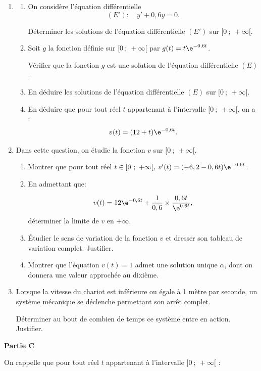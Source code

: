 \begin{enumerate}
\item 
	\begin{enumerate}
		\item On considère l'équation différentielle 
		\[(E') :\quad y' + 0,6y = 0.\]
		
Déterminer les solutions de l'équation différentielle $(E')$ sur $[0~;~+\infty[$.
		\item Soit $g$ la fonction définie sur $[0~;~+\infty[$ par $g(t) = t\e^{-0,6t}$.
		
Vérifier que la fonction $g$ est une solution de l'équation différentielle $(E)$.
		\item En déduire les solutions de l'équation différentielle $(E)$ sur $[0~;~+\infty[$.
		\item En déduire que pour tout réel $t$ appartenant à l'intervalle $[0~;~+\infty[$, on a :
\[v(t) = (12+t)\e^{-0,6t}.\]
	\end{enumerate}
\item Dans cette question, on étudie la fonction $v$ sur $[0~;~+\infty[$.
	\begin{enumerate}
		\item Montrer que pour tout réel $t \in [0~;~ +\infty[,\: v'(t) = (-6,2 - 0,6t)\e^{-0,6t}$.
		\item En admettant que:
		
\[v(t) = 12\e^{-0,6t} + \dfrac{1}{0,6} \times  \dfrac{0,6t}{\e^{0,6t}},\]
déterminer la limite de $v$ en $+\infty$.
		\item Étudier le sens de variation de la fonction $v$ et dresser son tableau de
variation complet. Justifier.
		\item Montrer que l'équation $v(t) = 1$ admet une solution unique $\alpha$, dont on
donnera une valeur approchée au dixième.
	\end{enumerate}
\item Lorsque la vitesse du chariot est inférieure ou égale à 1 mètre par seconde, un système mécanique se déclenche permettant son arrêt complet.

Déterminer au bout de combien de temps ce système entre en action. Justifier.
\end{enumerate}

\begin{center}\textbf{Partie C} \end{center}

On rappelle que pour tout réel $t$ appartenant à l'intervalle $[0~;~ +\infty[$ :

